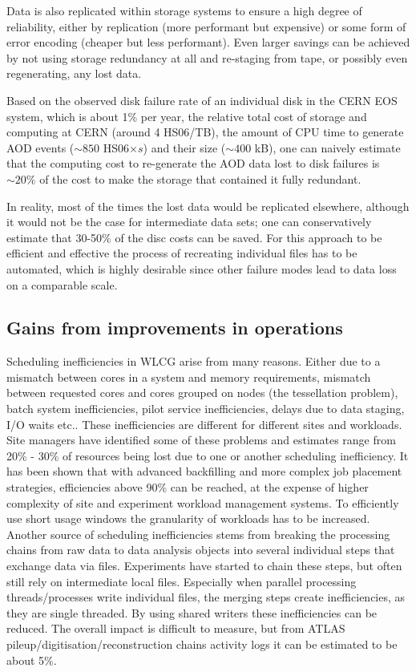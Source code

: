 Data is also replicated within storage systems to ensure a high degree
of reliability, either by replication (more performant but expensive)
or some form of error encoding (cheaper but less performant). Even
larger savings can be achieved by not using storage redundancy at all
and re-staging from tape, or possibly even regenerating, any lost
data.

Based on the observed disk failure rate of an individual disk in the
CERN EOS system, which is about 1\% per year, the relative total cost
of storage and computing at CERN (around 4 HS06/TB), the amount of CPU
time to generate AOD events ($\sim 850$ HS06$\times s$) and their size
($\sim 400$ kB), one can naively estimate that the computing cost to
re-generate the AOD data lost to disk failures is $\sim 20\%$ of the
cost to make the storage that contained it fully redundant.

In reality, most of the times the lost data would be replicated
elsewhere, although it would not be the case for intermediate data
sets; one can conservatively estimate that 30-50\% of the disc costs
can be saved. For this approach to be efficient and effective the
process of recreating individual files has to be automated, which is
highly desirable since other failure modes lead to data loss on a
comparable scale.

\subsection{Gains from improvements in operations}
Scheduling inefficiencies in WLCG arise from many reasons. Either due
to a mismatch between cores in a system and memory requirements,
mismatch between requested cores and cores grouped on nodes (the
tessellation problem), batch system inefficiencies, pilot service
inefficiencies, delays due to data staging, I/O waits etc.. These
inefficiencies are different for different sites and workloads. Site
managers have identified some of these problems and estimates range
from 20\% - 30\% of resources being lost due to one or another
scheduling inefficiency. It has been shown that with advanced
backfilling and more complex job placement strategies, efficiencies
above 90\% can be reached, at the expense of higher complexity of site
and experiment workload management systems. To efficiently use short
usage windows the granularity of workloads has to be
increased. Another source of scheduling inefficiencies stems from
breaking the processing chains from raw data to data analysis objects
into several individual steps that exchange data via
files. Experiments have started to chain these steps, but often still
rely on intermediate local files. Especially when parallel processing
threads/processes write individual files, the merging steps create
inefficiencies, as they are single threaded. By using shared writers
these inefficiencies can be reduced. The overall impact is difficult
to measure, but from ATLAS pileup/digitisation/reconstruction chains
activity logs it can be estimated to be about 5\%.

